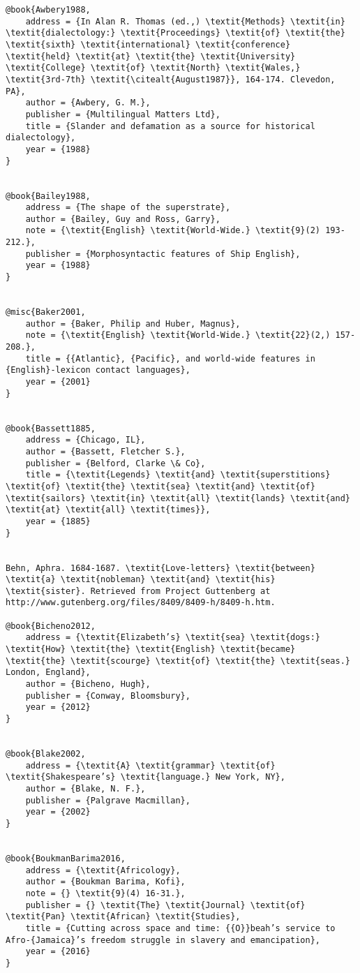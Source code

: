 \begin{verbatim}
@book{Awbery1988,
	address = {In Alan R. Thomas (ed.,) \textit{Methods} \textit{in} \textit{dialectology:} \textit{Proceedings} \textit{of} \textit{the} \textit{sixth} \textit{international} \textit{conference} \textit{held} \textit{at} \textit{the} \textit{University} \textit{College} \textit{of} \textit{North} \textit{Wales,} \textit{3rd-7th} \textit{\citealt{August1987}}, 164-174. Clevedon, PA},
	author = {Awbery, G. M.},
	publisher = {Multilingual Matters Ltd},
	title = {Slander and defamation as a source for historical dialectology},
	year = {1988}
}


@book{Bailey1988,
	address = {The shape of the superstrate},
	author = {Bailey, Guy and Ross, Garry},
	note = {\textit{English} \textit{World-Wide.} \textit{9}(2) 193-212.},
	publisher = {Morphosyntactic features of Ship English},
	year = {1988}
}


@misc{Baker2001,
	author = {Baker, Philip and Huber, Magnus},
	note = {\textit{English} \textit{World-Wide.} \textit{22}(2,) 157-208.},
	title = {{Atlantic}, {Pacific}, and world-wide features in {English}-lexicon contact languages},
	year = {2001}
}


@book{Bassett1885,
	address = {Chicago, IL},
	author = {Bassett, Fletcher S.},
	publisher = {Belford, Clarke \& Co},
	title = {\textit{Legends} \textit{and} \textit{superstitions} \textit{of} \textit{the} \textit{sea} \textit{and} \textit{of} \textit{sailors} \textit{in} \textit{all} \textit{lands} \textit{and} \textit{at} \textit{all} \textit{times}},
	year = {1885}
}


Behn, Aphra. 1684-1687. \textit{Love-letters} \textit{between} \textit{a} \textit{nobleman} \textit{and} \textit{his} \textit{sister}. Retrieved from Project Guttenberg at http://www.gutenberg.org/files/8409/8409-h/8409-h.htm.

@book{Bicheno2012,
	address = {\textit{Elizabeth’s} \textit{sea} \textit{dogs:} \textit{How} \textit{the} \textit{English} \textit{became} \textit{the} \textit{scourge} \textit{of} \textit{the} \textit{seas.} London, England},
	author = {Bicheno, Hugh},
	publisher = {Conway, Bloomsbury},
	year = {2012}
}


@book{Blake2002,
	address = {\textit{A} \textit{grammar} \textit{of} \textit{Shakespeare’s} \textit{language.} New York, NY},
	author = {Blake, N. F.},
	publisher = {Palgrave Macmillan},
	year = {2002}
}


@book{BoukmanBarima2016,
	address = {\textit{Africology},
	author = {Boukman Barima, Kofi},
	note = {} \textit{9}(4) 16-31.},
	publisher = {} \textit{The} \textit{Journal} \textit{of} \textit{Pan} \textit{African} \textit{Studies},
	title = {Cutting across space and time: {{O}}beah’s service to Afro-{Jamaica}’s freedom struggle in slavery and emancipation},
	year = {2016}
}



\end{verbatim}
